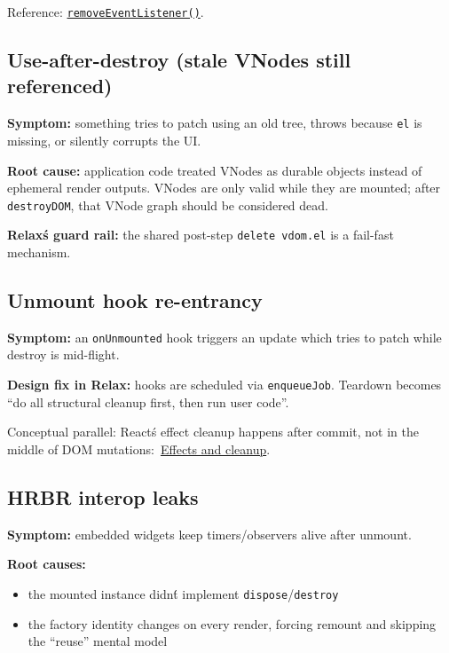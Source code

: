 Reference: \href{https://developer.mozilla.org/en-US/docs/Web/API/EventTarget/removeEventListener}{\texttt{removeEventListener()}}.

\subsection{Use-after-destroy (stale VNodes still referenced)}

	\textbf{Symptom:} something tries to patch using an old tree, throws because \texttt{el} is missing, or silently corrupts the UI.

	\textbf{Root cause:} application code treated VNodes as durable objects instead of ephemeral render outputs.
VNodes are only valid while they are mounted; after \texttt{destroyDOM}, that VNode graph should be considered dead.

	\textbf{Relax\'s guard rail:} the shared post-step \texttt{delete vdom.el} is a fail-fast mechanism.

\subsection{Unmount hook re-entrancy}

	\textbf{Symptom:} an \texttt{onUnmounted} hook triggers an update which tries to patch while destroy is mid-flight.

	\textbf{Design fix in Relax:} hooks are scheduled via \texttt{enqueueJob}.
Teardown becomes ``do all structural cleanup first, then run user code''.

Conceptual parallel: React\'s effect cleanup happens after commit, not in the middle of DOM mutations:\
\href{https://react.dev/reference/react/useEffect#effects-and-cleanup}{Effects and cleanup}.

\subsection{HRBR interop leaks}

	\textbf{Symptom:} embedded widgets keep timers/observers alive after unmount.

	\textbf{Root causes:}

\begin{itemize}
  \item the mounted instance didn\'t implement \texttt{dispose}/\texttt{destroy}
  \item the factory identity changes on every render, forcing remount and skipping the ``reuse'' mental model
\end{itemize}

